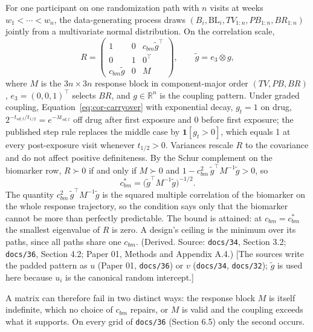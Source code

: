 \documentclass[11pt]{article}
\newcommand{\note}[1]{\textcolor{blue!60!black}{\small [#1]}}
\newcommand{\code}[1]{\texttt{#1}}
\begin{document}
For one participant on one randomization path with $n$ visits at weeks
$w_1 < \cdots < w_n$, the data-generating process draws
$(B_i, \mathrm{BL}_i, TV_{1:n}, PB_{1:n}, BR_{1:n})$ jointly from a
multivariate normal distribution. On the correlation scale,
\begin{equation}
R = \begin{pmatrix} 1 & 0 & c_{bm}\tilde g^{\top} \\ 0 & 1 & 0^{\top} \\
  c_{bm}\tilde g & 0 & M \end{pmatrix},
\qquad \tilde g = e_3 \otimes g,
\label{eq:ce-R}
\end{equation}
where $M$ is the $3n \times 3n$ response block in component-major
order $(TV, PB, BR)$, $e_3 = (0,0,1)^{\top}$ selects $BR$, and
$g \in \mathbb{R}^n$ is the coupling pattern. Under graded coupling,
Equation~\eqref{eq:cor-carryover} with exponential decay, $g_t = 1$ on
drug, $2^{-t_{sd,t}/t_{1/2}} = e^{-\lambda t_{sd,t}}$ off drug after
first exposure and 0 before first exposure; the published step rule
replaces the middle case by
$\mathbf{1}[g_t > 0]$, which equals 1 at every post-exposure visit
whenever $t_{1/2} > 0$. Variances rescale $R$ to the covariance and do
not affect positive definiteness. By the Schur complement on the
biomarker row, $R \succ 0$ if and only if $M \succ 0$ and
$1 - c_{bm}^2\,\tilde g^{\top} M^{-1} \tilde g > 0$, so
\begin{equation}
c_{bm}^{\ast} = \bigl(\tilde g^{\top} M^{-1} \tilde g\bigr)^{-1/2}.
\label{eq:ce-ceiling}
\end{equation}
The quantity $c_{bm}^2\,\tilde g^{\top} M^{-1}\tilde g$ is the squared
multiple correlation of the biomarker on the whole response
trajectory, so the condition says only that the biomarker cannot be
more than perfectly predictable. The bound is attained: at
$c_{bm} = c_{bm}^{\ast}$ the smallest eigenvalue of $R$ is zero. A
design's ceiling is the minimum over its paths, since all paths share
one $c_{bm}$. (Derived. Source: \code{docs/34}, Section 3.2;
\code{docs/36}, Section 4.2; Paper 01, Methods and Appendix A.4.)
\note{The sources write the padded pattern as $u$ (Paper 01,
\code{docs/36}) or $v$ (\code{docs/34}, \code{docs/32}); $\tilde g$ is
used here because $u_i$ is the canonical random intercept.}

A matrix can therefore fail in two distinct ways: the response block
$M$ is itself indefinite, which no choice of $c_{bm}$ repairs, or $M$
is valid and the coupling exceeds what it supports. On every grid of
\code{docs/36} (Section 6.5) only the second occurs.
\end{document}
